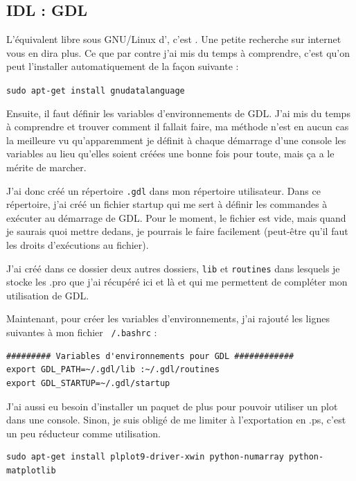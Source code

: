 \documentclass[a4paper,twoside]{article}
\begin{document}
\subsection{IDL : GDL}
L'équivalent libre sous GNU/Linux d', c'est . Une petite recherche sur internet vous en dira plus. Ce que par contre j'ai mis du temps à comprendre, c'est qu'on peut l'installer automatiquement de la façon suivante :

\verb|sudo apt-get install gnudatalanguage|

Ensuite, il faut définir les variables d'environnements de GDL. J'ai mis du temps à comprendre et trouver comment il fallait faire, ma méthode n'est en aucun cas la meilleure vu qu'apparemment je définit à chaque démarrage d'une console les variables au lieu qu'elles soient créées une bonne fois pour toute, mais ça a le mérite de marcher.

J'ai donc créé un répertoire \texttt{.gdl} dans mon répertoire utilisateur. Dans ce répertoire, j'ai créé un fichier startup qui me sert à définir les commandes à exécuter au démarrage de GDL. Pour le moment, le fichier est vide, mais quand je saurais quoi mettre dedans, je pourrais le faire facilement (peut-être qu'il faut les droits d'exécutions au fichier).

J'ai créé dans ce dossier deux autres dossiers, \texttt{lib} et \texttt{routines} dans lesquels je stocke les .pro que j'ai récupéré ici et là et qui me permettent de compléter mon utilisation de GDL.

Maintenant, pour créer les variables d'environnements, j'ai rajouté les lignes suivantes à mon fichier \texttt{~/.bashrc} :
\begin{verbatim}
######### Variables d'environnements pour GDL ############
export GDL_PATH=~/.gdl/lib :~/.gdl/routines
export GDL_STARTUP=~/.gdl/startup
\end{verbatim}

J'ai aussi eu besoin d'installer un paquet de plus pour pouvoir utiliser un plot dans une console. Sinon, je suis obligé de me limiter à l'exportation en .ps, c'est un peu réducteur comme utilisation.

\begin{verbatim}
sudo apt-get install plplot9-driver-xwin python-numarray python-matplotlib
\end{verbatim}

\end{document}
